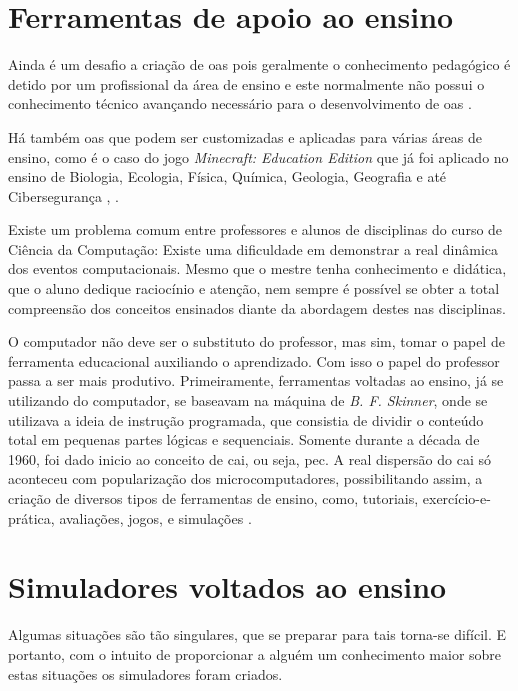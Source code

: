 \section{Ferramentas de apoio ao ensino}
\label{sec:ferramentaspoioensino}

Ainda é um desafio a criação de \acrshort{oa}s pois geralmente o conhecimento pedagógico é detido por um profissional da área de ensino e este normalmente não possui o conhecimento técnico avançando necessário para o desenvolvimento de \acrshort{oa}s \cite{braga15}.

Há também \acrshort{oa}s que podem ser customizadas e aplicadas para várias áreas de ensino, como é o caso do jogo \textit{Minecraft: Education Edition} que já foi aplicado no ensino de Biologia, Ecologia, Física, Química, Geologia, Geografia \cite{short12} e até Cibersegurança \cite{geary19}, .

Existe um problema comum entre professores e alunos de disciplinas do curso de Ciência da Computação: Existe uma dificuldade em demonstrar a real dinâmica dos eventos computacionais. Mesmo que o mestre tenha conhecimento e didática, que o aluno dedique raciocínio e atenção, nem sempre é possível se obter a total compreensão dos conceitos ensinados diante da abordagem destes nas disciplinas.

O computador não deve ser o substituto do professor, mas sim, tomar o papel de ferramenta educacional auxiliando o aprendizado. Com isso o papel do professor passa a ser mais produtivo. Primeiramente, ferramentas voltadas ao ensino, já se utilizando do computador, se baseavam na máquina de \textit{B. F. Skinner}, onde se utilizava a ideia de instrução programada, que consistia de dividir o conteúdo total em pequenas partes lógicas e sequenciais. Somente durante a década de 1960, foi dado inicio ao conceito de \acrfull{cai}, ou seja, \acrfull{pec}. A real dispersão do \acrshort{cai} só aconteceu com popularização dos microcomputadores, possibilitando assim, a criação de diversos tipos de ferramentas de ensino, como, tutoriais, exercício-e-prática, avaliações, jogos, e simulações \cite{hamawaki09}.

\section{Simuladores voltados ao ensino}
\label{sec:simuladoresvoltadosensino}

Algumas situações são tão singulares, que se preparar para tais torna-se difícil. E portanto, com o intuito de proporcionar a alguém um conhecimento maior sobre estas situações os simuladores foram criados.

